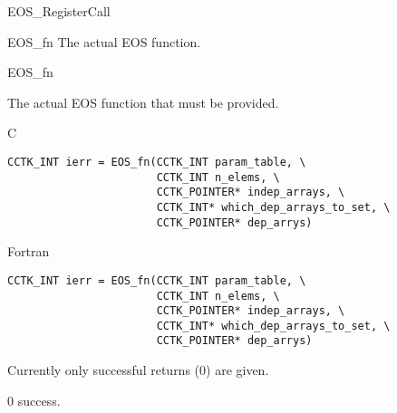 \begin{FunctionDescription}{EOS\_RegisterCall}
  \begin{SeeAlsoSection}
    \begin{SeeAlso}{EOS\_fn}
      The actual EOS function.
    \end{SeeAlso}
  \end{SeeAlsoSection}
\end{FunctionDescription}


\begin{FunctionDescription}{EOS\_fn}
  \label{Whisky_Dev_EOSBase_General_EOS_fn}  
  
  The actual EOS function that must be provided.

  \begin{SynopsisSection}
    \begin{Synopsis}{C}
\begin{verbatim}
CCTK_INT ierr = EOS_fn(CCTK_INT param_table, \
                       CCTK_INT n_elems, \
                       CCTK_POINTER* indep_arrays, \
                       CCTK_INT* which_dep_arrays_to_set, \
                       CCTK_POINTER* dep_arrys)
\end{verbatim}
    \end{Synopsis}
    \begin{Synopsis}{Fortran}
\begin{verbatim}
CCTK_INT ierr = EOS_fn(CCTK_INT param_table, \
                       CCTK_INT n_elems, \
                       CCTK_POINTER* indep_arrays, \
                       CCTK_INT* which_dep_arrays_to_set, \
                       CCTK_POINTER* dep_arrys)
\end{verbatim}
    \end{Synopsis}
  \end{SynopsisSection}

  \begin{ResultSection}
    \begin{ResultNote}
      Currently only successful returns (0) are given.
    \end{ResultNote}
    \begin{Result}{\rm 0}
      success.
    \end{Result}
  \end{ResultSection}


\end{FunctionDescription}
